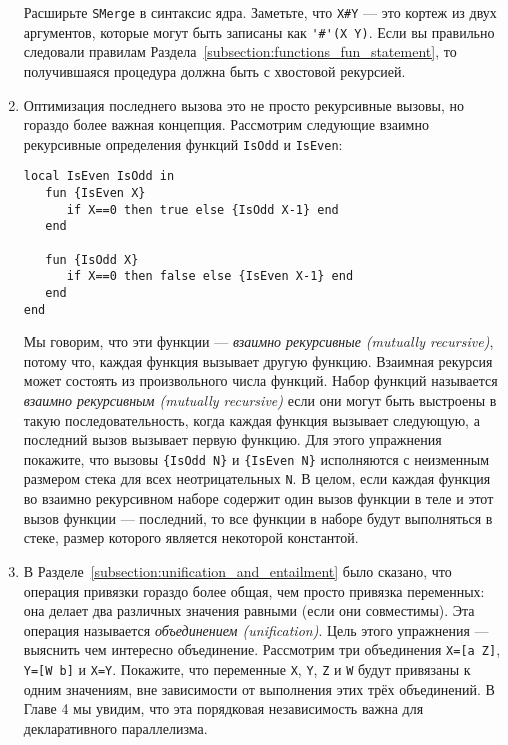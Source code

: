 \begin{enumerate}
{Расширьте \lstinline!SMerge! в синтаксис ядра. Заметьте, что \lstinline!X#Y! --- это кортеж из двух аргументов, которые могут быть записаны как \lstinline!'#'(X Y)!. Если вы правильно следовали правилам Раздела~\ref{subsection:functions_fun_statement}, то получившаяся процедура должна быть с хвостовой рекурсией.}

\item{Оптимизация последнего вызова это не просто рекурсивные вызовы, но гораздо более важная концепция. Рассмотрим следующие взаимно рекурсивные определения функций \lstinline!IsOdd! и \lstinline!IsEven!:

  \begin{lstlisting}
local IsEven IsOdd in
   fun {IsEven X}
      if X==0 then true else {IsOdd X-1} end
   end

   fun {IsOdd X}
      if X==0 then false else {IsEven X-1} end
   end
end
  \end{lstlisting}
  
Мы говорим, что эти функции --- \emph{взаимно рекурсивные ({mutually recursive})}, потому что, каждая функция вызывает другую функцию. Взаимная рекурсия может состоять из произвольного числа функций. Набор функций называется \emph{взаимно рекурсивным ({mutually recursive})} если они могут быть выстроены в такую последовательность, когда каждая функция вызывает следующую, а последний вызов вызывает первую функцию. Для этого упражнения покажите, что вызовы \lstinline!{IsOdd N}! и \lstinline!{IsEven N}! исполняются с неизменным размером стека для всех неотрицательных \lstinline!N!. В целом, если каждая функция во взаимно рекурсивном наборе содержит один вызов функции в теле и этот вызов функции --- последний, то все функции в наборе будут выполняться в стеке, размер которого является некоторой константой.}

\item{В Разделе~\ref{subsection:unification_and_entailment} было сказано, что операция привязки гораздо более общая, чем просто привязка переменных: она делает два различных значения равными (если они совместимы). Эта операция называется \emph{объединением (unification)}. Цель этого упражнения --- выяснить чем интересно объединение. Рассмотрим три объединения \lstinline!X=[a Z]!, \lstinline!Y=[W b]! и \lstinline!X=Y!. Покажите, что переменные \lstinline!X!, \lstinline!Y!, \lstinline!Z! и \lstinline!W! будут привязаны к одним значениям, вне зависимости от выполнения этих трёх объединений. В Главе 4 мы увидим, что эта порядковая независимость важна для декларативного параллелизма.}
\end{enumerate}
